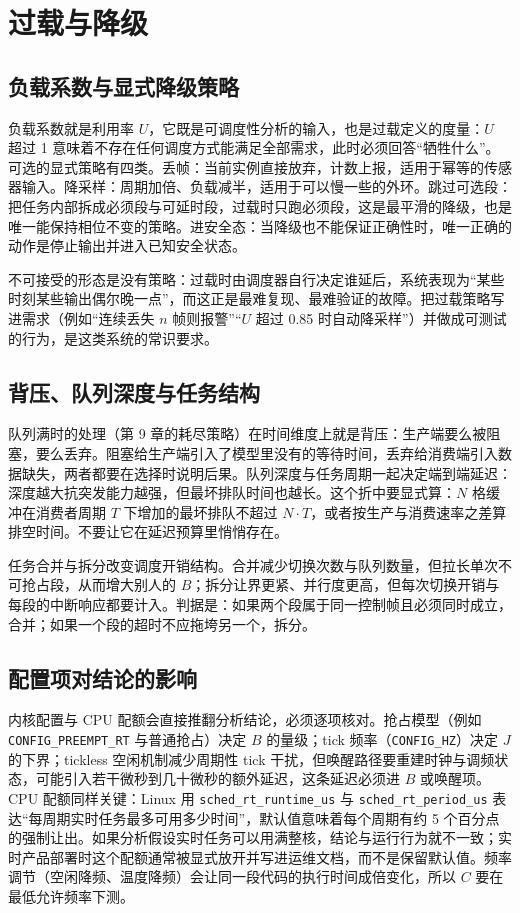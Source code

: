 \documentclass[12pt,a4paper,fontset=fandol]{ctexbook}
\begin{document}
\section{过载与降级}

\subsection*{负载系数与显式降级策略}

负载系数就是利用率 $U$，它既是可调度性分析的输入，也是过载定义的度量：$U$ 超过 1 意味着不存在任何调度方式能满足全部需求，此时必须回答“牺牲什么”。可选的显式策略有四类。丢帧：当前实例直接放弃，计数上报，适用于幂等的传感器输入。降采样：周期加倍、负载减半，适用于可以慢一些的外环。跳过可选段：把任务内部拆成必须段与可延时段，过载时只跑必须段，这是最平滑的降级，也是唯一能保持相位不变的策略。进安全态：当降级也不能保证正确性时，唯一正确的动作是停止输出并进入已知安全状态。

不可接受的形态是没有策略：过载时由调度器自行决定谁延后，系统表现为“某些时刻某些输出偶尔晚一点”，而这正是最难复现、最难验证的故障。把过载策略写进需求（例如“连续丢失 $n$ 帧则报警”“$U$ 超过 0.85 时自动降采样”）并做成可测试的行为，是这类系统的常识要求。

\subsection*{背压、队列深度与任务结构}

队列满时的处理（第 9 章的耗尽策略）在时间维度上就是背压：生产端要么被阻塞，要么丢弃。阻塞给生产端引入了模型里没有的等待时间，丢弃给消费端引入数据缺失，两者都要在选择时说明后果。队列深度与任务周期一起决定端到端延迟：深度越大抗突发能力越强，但最坏排队时间也越长。这个折中要显式算：$N$ 格缓冲在消费者周期 $T$ 下增加的最坏排队不超过 $N \cdot T$，或者按生产与消费速率之差算排空时间。不要让它在延迟预算里悄悄存在。

任务合并与拆分改变调度开销结构。合并减少切换次数与队列数量，但拉长单次不可抢占段，从而增大别人的 $B$；拆分让界更紧、并行度更高，但每次切换开销与每段的中断响应都要计入。判据是：如果两个段属于同一控制帧且必须同时成立，合并；如果一个段的超时不应拖垮另一个，拆分。

\subsection*{配置项对结论的影响}

内核配置与 CPU 配额会直接推翻分析结论，必须逐项核对。抢占模型（例如 \texttt{CONFIG\_PREEMPT\_RT} 与普通抢占）决定 $B$ 的量级；tick 频率（\texttt{CONFIG\_HZ}）决定 $J$ 的下界；tickless 空闲机制减少周期性 tick 干扰，但唤醒路径要重建时钟与调频状态，可能引入若干微秒到几十微秒的额外延迟，这条延迟必须进 $B$ 或唤醒项。CPU 配额同样关键：Linux 用 \texttt{sched\_rt\_runtime\_us} 与 \texttt{sched\_rt\_period\_us} 表达“每周期实时任务最多可用多少时间”，默认值意味着每个周期有约 5 个百分点的强制让出。如果分析假设实时任务可以用满整核，结论与运行行为就不一致；实时产品部署时这个配额通常被显式放开并写进运维文档，而不是保留默认值。频率调节（空闲降频、温度降频）会让同一段代码的执行时间成倍变化，所以 $C$ 要在最低允许频率下测。
\end{document}
